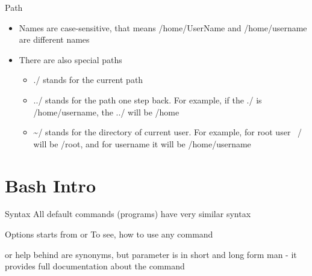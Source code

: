 \documentclass[usenames,dvipsnames,10pt,aspectratio=169]{beamer}
\begin{document}
\begin{frame}{Path}
    \begin{itemize}
        \item Names are case-sensitive, that means {\color{ucugreen} /home/UserName} and {\color{ucugreen} /home/username} are different names
        \item There are also special paths
        \begin{itemize}
            \item {\color{ucugreen} ./} stands for the current path
            \item {\color{ucugreen} ../} stands for the path one step back. For example, if the {\color{ucugreen} ./} is {\color{ucugreen} /home/username}, the {\color{ucugreen} ../} will be {\color{ucugreen} /home}
            \item {\color{ucugreen} \textasciitilde /} stands for the directory of current user. For example, for {\color{ucugreen} root} user {\color{ucugreen} ~/} will be {\color{ucugreen} /root}, and for {\color{ucugreen} username} it will be {\color{ucugreen} /home/username}
        \end{itemize}
    \end{itemize}
\end{frame}

\section{Bash Intro}

\begin{frame}{Syntax}
    All default commands (programs) have very similar syntax
    \begin{examples}
    \end{examples}
    Options starts from \ex{-} or \ex{-{}-} \newline
    To see, how to use any command
    \begin{examples}
         \newline or
        help \newline behind are synonyms, but parameter is in short and long form \newline
        man   - it provides full documentation about the command
    \end{examples}
\end{frame}
\end{document}
